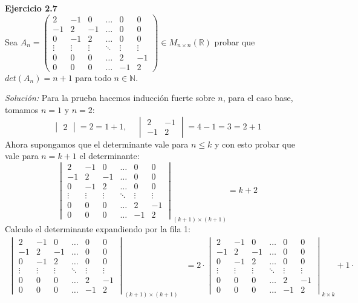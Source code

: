 \documentclass{article}
\newenvironment{problem}[2][Ejercicio]
    { \begin{mdframed}[backgroundcolor=gray!20] \textbf{#1 #2} \\}
    {  \end{mdframed}}
\newenvironment{solution}
    {\textit{Solución:}}
    {}
\begin{document}
\begin{problem}{2.7}
    Sea $A_n = \begin{pmatrix} 2 & -1 & 0 & \dots & 0 & 0 \\ -1 & 2 & -1 & \dots & 0 & 0 \\ 0 & -1 & 2 & \dots & 0 & 0 \\ \vdots & \vdots & \vdots & \ddots & \vdots & \vdots \\ 0 & 0 & 0 & \dots & 2 & -1 \\ 0 & 0 & 0 & \dots & -1 & 2 \end{pmatrix} \in M_{n\times n}(\mathbb{R})$ probar que $det(A_n)=n+1$ para todo $n\in \mathbb{N}$.
\end{problem}
\begin{solution}
    Para la prueba hacemos inducción fuerte sobre $n$, para el caso base, tomamos $n=1$ y $n=2$:
\[
\begin{vmatrix}
2
\end{vmatrix} = 2 = 1+1, \ \ \ \ \ 
\begin{vmatrix}
2 & -1 \\
-1 & 2
\end{vmatrix} = 4-1 = 3 = 2+1
\]
Ahora supongamos que el determinante vale para $n\leq k$ y con esto probar que vale para $n=k+1$ el determinante:
\[
\begin{vmatrix} 2 & -1 & 0 & \dots & 0 & 0 \\ -1 & 2 & -1 & \dots & 0 & 0 \\ 0 & -1 & 2 & \dots & 0 & 0 \\ \vdots & \vdots & \vdots & \ddots & \vdots & \vdots \\ 0 & 0 & 0 & \dots & 2 & -1 \\ 0 & 0 & 0 & \dots & -1 & 2 \end{vmatrix}_{(k+1)\times(k+1)} = k+2
\]
Calculo el determinante expandiendo por la fila 1:
\[
\begin{aligned}
\begin{vmatrix} 2 & -1 & 0 & \dots & 0 & 0 \\ -1 & 2 & -1 & \dots & 0 & 0 \\ 0 & -1 & 2 & \dots & 0 & 0 \\ \vdots & \vdots & \vdots & \ddots & \vdots & \vdots \\ 0 & 0 & 0 & \dots & 2 & -1 \\ 0 & 0 & 0 & \dots & -1 & 2 \end{vmatrix}_{(k+1)\times(k+1)} &= 2 \cdot 
\begin{vmatrix} 2 & -1 & 0 & \dots & 0 & 0 \\ -1 & 2 & -1 & \dots & 0 & 0 \\ 0 & -1 & 2 & \dots & 0 & 0 \\ \vdots & \vdots & \vdots & \ddots & \vdots & \vdots \\ 0 & 0 & 0 & \dots & 2 & -1 \\ 0 & 0 & 0 & \dots & -1 & 2 \end{vmatrix}_{k\times k} + 1 \cdot 

\end{aligned}\]
\end{solution}
\end{document}
